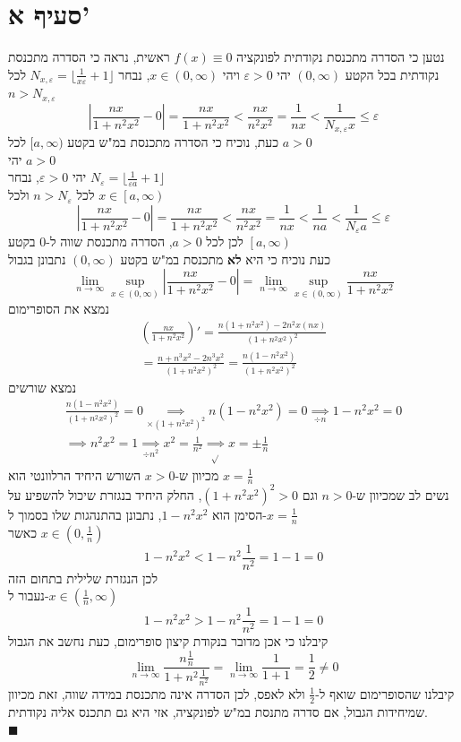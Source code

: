 \documentclass[12pt, titlepage]{article}
\begin{document}
\section*{סעיף א'}
נטען כי הסדרה מתכנסת נקודתית לפונקציה $f\left(x\right) \equiv 0$
ראשית, נראה כי הסדרה מתכנסת נקודתית בכל הקטע $\left(0,\infty\right)$
יהי $\varepsilon > 0$ ויהי $x \in \left(0,\infty\right)$, נבחר $N_{x,\varepsilon}=\lfloor \frac{1}{x\varepsilon} + 1\rfloor$ 
לכל $n>N_{x,\varepsilon}$
\[
    \left|\frac{nx}{1+n^2x^2}-0\right| = \frac{nx}{1+n^2x^2} < \frac{nx}{n^2x^2} = \frac{1}{nx} < \frac{1}{N_{x,\varepsilon}x} \leq \varepsilon
\]
כעת, נוכיח כי הסדרה מתכנסת במ"ש בקטע $[a,\infty)$ לכל $a>0$\\
יהי $a>0$\\
יהי $\varepsilon > 0$, נבחר $N_{\varepsilon} = \lfloor \frac{1}{\varepsilon a} + 1 \rfloor$\\
לכל $n>N_{\varepsilon}$ ולכל $x\in\left[a,\infty\right)$
\[
    \left|\frac{nx}{1+n^2x^2} - 0\right| = \frac{nx}{1+n^2x^2} < \frac{nx}{n^2x^2} = \frac{1}{nx} < \frac{1}{na} < \frac{1}{N_{\varepsilon}a} \leq \varepsilon
\]
לכן לכל $a>0$, הסדרה מתכנסת שווה ל-$0$ בקטע $\left[a,\infty\right)$\\
כעת נוכיח כי היא \textbf{לא} מתכנסת במ"ש בקטע $\left(0,\infty\right)$
נתבונן בגבול
\[
    \lim_{n\to\infty} \sup_{x\in\left(0,\infty\right)}\left|\frac{nx}{1+n^2x^2}-0\right| = \lim_{n\to\infty} \sup_{x\in\left(0,\infty\right)} \frac{nx}{1+n^2x^2}
\]
נמצא את הסופרימום
\begin{gather*}
    \left(\frac{nx}{1+n^2x^2}\right)' = \frac{n\left(1+n^2x^2\right)-2n^2x\left(nx\right)}{\left(1+n^2x^2\right)^2} \\
    = \frac{n+n^3x^2 - 2n^3x^2}{\left(1+n^2x^2\right)^2} = \frac{n\left(1-n^2x^2\right)}{\left(1+n^2x^2\right)^2}
\end{gather*}
נמצא שורשים
\begin{gather*}
    \frac{n\left(1-n^2x^2\right)}{\left(1+n^2x^2\right)^2} = 0 \underset{\times \left(1+n^2x^2\right)^2}{\implies} n\left(1-n^2x^2\right) = 0 \underset{\div n}{\implies} 1-n^2x^2 =0  \\
    \implies n^2x^2 = 1 \underset{\div n^2}{\implies} x^2 = \frac{1}{n^2} \underset{\sqrt{}}{\implies} x = \pm \frac{1}{n}
\end{gather*}
מכיוון ש-$x >0$ השורש היחיד הרלוונטי הוא $x=\frac{1}{n}$\\
נשים לב שמכיוון ש-$n>0$ וגם $\left(1+n^2x^2\right)^2>0$, החלק היחיד בנגזרת שיכול להשפיע על הסימן הוא $1-n^2x^2$, נתבונן בהתנהגות שלו בסמוך ל-$x=\frac{1}{n}$\\
כאשר $x\in\left(0,\frac{1}{n}\right)$
\[
    1-n^2x^2 < 1 - n^2 \frac{1}{n^2} = 1-1 = 0 
\]
לכן הנגזרת שלילית בתחום הזה\\
נעבור ל-$x\in\left(\frac{1}{n},\infty\right)$
\[
    1-n^2x^2 > 1-n^2 \frac{1}{n^2} = 1-1 = 0
\]
קיבלנו כי אכן מדובר בנקודת קיצון סופרימום, כעת נחשב את הגבול
\[
    \lim_{n\to\infty} \frac{n\frac{1}{n}}{1+n^2\frac{1}{n^2}} = \lim_{n\to\infty} \frac{1}{1+1} = \frac{1}{2} \neq 0
\]
קיבלנו שהסופרימום שואף ל-$\frac{1}{2}$ ולא לאפס, לכן הסדרה אינה מתכנסת במידה שווה, זאת מכיוון שמיחידות הגבול, אם סדרה מתנסת במ"ש לפונקציה, אזי היא גם תתכנס אליה נקודתית.\\
$\blacksquare$
\end{document}
